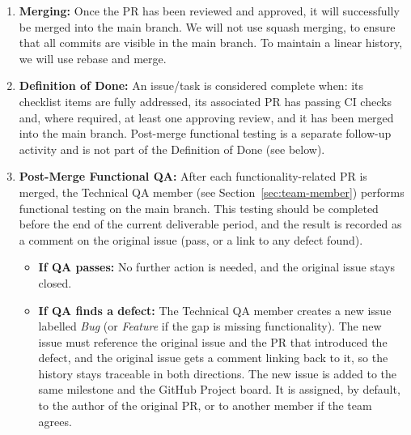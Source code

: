 \documentclass{article}
\begin{document}
\begin{itemize}
\begin{enumerate}
              \item \textbf{Merging:} Once the PR has been reviewed and approved, it will successfully
                    be merged into the main branch. We will not use squash merging, to ensure that all commits are visible in the main branch. To maintain a linear history, we will use rebase and merge.
              \item \textbf{Definition of Done:} An issue/task is considered
                    complete when: its checklist items are fully addressed,
                    its associated PR has passing CI checks and, where
                    required, at least one approving review, and it has been
                    merged into the main branch. Post-merge functional
                    testing is a separate follow-up activity and is not part
                    of the Definition of Done (see below).
              \item \textbf{Post-Merge Functional QA:} After each functionality-related PR is merged, the Technical QA
                    member (see Section~\ref{sec:team-member}) performs
                    functional testing on the main branch. This testing
                    should be completed before the end of the current
                    deliverable period, and the result is recorded as a
                    comment on the original issue (pass, or a link to any
                    defect found).
                  \begin{itemize}
                      \item \textbf{If QA passes:} No further action is
                            needed, and the original issue stays closed.
                      \item \textbf{If QA finds a defect:} The Technical QA member creates a new
                            issue labelled \emph{Bug} (or \emph{Feature}
                            if the gap is missing functionality). The new
                            issue must reference the original issue and
                            the PR that introduced the defect, and the
                            original issue gets a comment linking back to
                            it, so the history stays traceable in both
                            directions. The new issue is added to the same milestone
                            and the GitHub Project board. It is assigned, by
                            default, to the author of the original PR, or
                            to another member if the team agrees.
                  \end{itemize}
          \end{enumerate}


\end{itemize}
\end{document}
